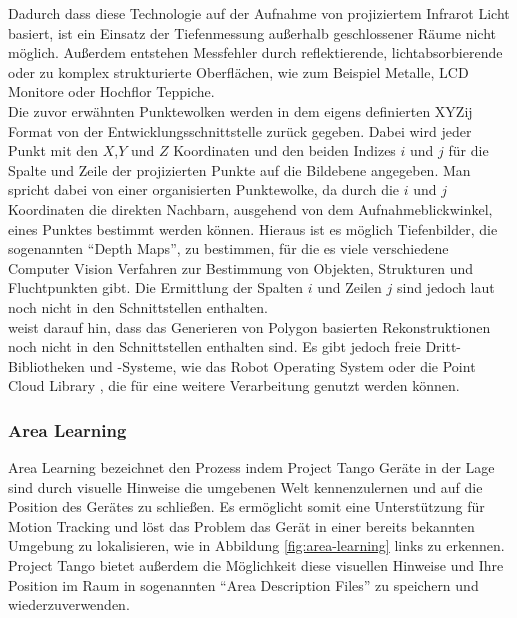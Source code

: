 Dadurch dass diese Technologie auf der Aufnahme von projiziertem Infrarot Licht basiert, ist ein Einsatz der Tiefenmessung außerhalb geschlossener Räume nicht möglich. \citep{GoogleDevelopersConcepts:online} Außerdem entstehen Messfehler durch reflektierende,  lichtabsorbierende oder zu komplex strukturierte Oberflächen, wie zum Beispiel Metalle, LCD Monitore oder Hochflor Teppiche. \\

Die zuvor erwähnten Punktewolken werden in dem eigens definierten XYZij Format von der Entwicklungsschnittstelle zurück gegeben. Dabei wird jeder Punkt mit den \(X\),\(Y\) und \(Z\) Koordinaten und den beiden Indizes \(i \) und \(j \) für die Spalte und Zeile der projizierten Punkte auf die Bildebene angegeben. \citep{GoogleDevelopersConcepts:online} Man spricht dabei von einer organisierten Punktewolke, da durch die \(i\) und \(j\) Koordinaten die direkten Nachbarn, ausgehend von dem Aufnahmeblickwinkel, eines Punktes bestimmt werden können. Hieraus ist es möglich Tiefenbilder, die sogenannten \enquote{Depth Maps}, zu bestimmen, für die es viele verschiedene Computer Vision Verfahren zur Bestimmung von Objekten, Strukturen und Fluchtpunkten gibt. Die Ermittlung der Spalten \(i\) und Zeilen \(j\) sind jedoch laut \citet{GoogleDevelopersKnownIssues:online} noch nicht in den Schnittstellen enthalten.\\ 

\citet{GoogleDevelopersConcepts:online} weist darauf hin, dass das Generieren von Polygon basierten Rekonstruktionen noch nicht in den Schnittstellen enthalten sind. Es gibt jedoch freie Dritt-Bibliotheken und -Systeme, wie das Robot Operating System \citep{ROS} oder die Point Cloud Library \citep{pcl}, die für eine weitere Verarbeitung genutzt werden können.

\subsubsection{Area Learning} \label{subsec:area-learning}

Area Learning bezeichnet den Prozess indem Project Tango Geräte in der Lage sind durch visuelle Hinweise die umgebenen Welt kennenzulernen und auf die Position des Gerätes zu schließen. 
Es ermöglicht somit eine Unterstützung für Motion Tracking und löst das Problem das Gerät in einer bereits bekannten Umgebung zu lokalisieren, wie in Abbildung \ref{fig:area-learning} links zu erkennen.
Project Tango bietet außerdem die Möglichkeit diese visuellen Hinweise und Ihre Position im Raum in sogenannten \enquote{Area Description Files} zu speichern und wiederzuverwenden. \citep{GoogleDevelopersConcepts:online}\\

